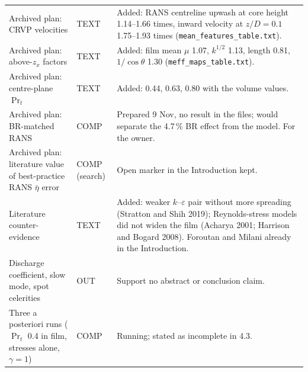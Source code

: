 \documentclass[10pt]{article}
\begin{document}
{\begin{longtable}{@{}L{4.4cm} L{1.2cm} L{11.0cm}@{}}
Archived plan: CRVP velocities & TEXT & Added: RANS centreline upwash at core height 1.14--1.66 times, inward velocity at $z/D=0.1$ 1.75--1.93 times (\texttt{mean\_features\_table.txt}). \\
Archived plan: above-$z_x$ factors & TEXT & Added: film mean $\mu$ 1.07, $k^{1/2}$ 1.13, length 0.81, $1/\cos\theta$ 1.30 (\texttt{meff\_maps\_table.txt}). \\
Archived plan: centre-plane $\Pr_t$ & TEXT & Added: 0.44, 0.63, 0.80 with the volume values. \\
Archived plan: BR-matched RANS & COMP & Prepared 9 Nov, no result in the files; would separate the 4.7\,\% BR effect from the model. For the owner. \\
Archived plan: literature value of best-practice RANS $\bar\eta$ error & COMP (search) & Open marker in the Introduction kept. \\
Literature counter-evidence & TEXT & Added: weaker $k$--$\varepsilon$ pair without more spreading (Stratton and Shih 2019); Reynolds-stress models did not widen the film (Acharya 2001; Harrison and Bogard 2008). Foroutan and Milani already in the Introduction. \\
Discharge coefficient, slow mode, spot celerities & OUT & Support no abstract or conclusion claim. \\
Three a posteriori runs ($\Pr_t$ 0.4 in film, stresses alone, $\gamma=1$) & COMP & Running; stated as incomplete in 4.3. \\
\bottomrule
\end{longtable}}

\end{document}
